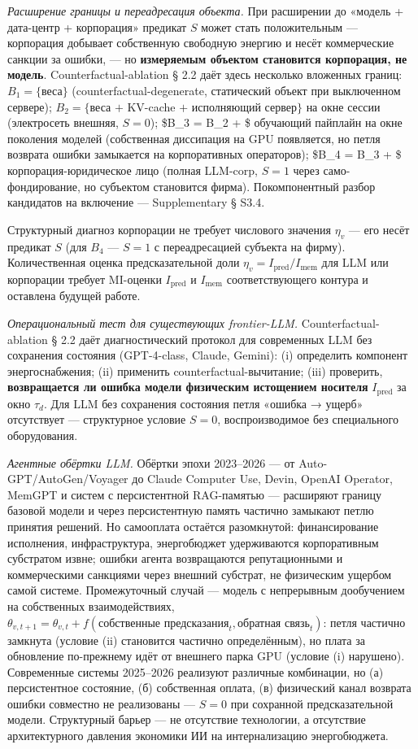 \documentclass[pdflatex,sn-mathphys-ay]{sn-jnl}
\begin{document}
\emph{Расширение границы и переадресация объекта.} При расширении до «модель + дата-центр + корпорация» предикат \(S\) может стать положительным --- корпорация добывает собственную свободную энергию и несёт коммерческие санкции за ошибки, --- но \textbf{измеряемым объектом становится корпорация, не модель}. Counterfactual-ablation § 2.2 даёт здесь несколько вложенных границ: \(B_1 = \{\)веса\(\}\) (counterfactual-degenerate, статический объект при выключенном сервере); \(B_2 = \{\)веса \(+\) KV-cache \(+\) исполняющий сервер\(\}\) на окне сессии (электросеть внешняя, \(S = 0\)); \$B\_3 = B\_2 + \$ обучающий пайплайн на окне поколения моделей (собственная диссипация на GPU появляется, но петля возврата ошибки замыкается на корпоративных операторов); \$B\_4 = B\_3 + \$ корпорация-юридическое лицо (полная LLM-corp, \(S = 1\) через само-фондирование, но субъектом становится фирма). Покомпонентный разбор кандидатов на включение --- Supplementary § S3.4.

Структурный диагноз корпорации не требует числового значения \(\eta_v\) --- его несёт предикат \(S\) (для \(B_4\) --- \(S = 1\) с переадресацией субъекта на фирму). Количественная оценка предсказательной доли \(\eta_v = I_{\text{pred}}/I_{\text{mem}}\) для LLM или корпорации требует MI-оценки \(I_{\text{pred}}\) и \(I_{\text{mem}}\) соответствующего контура и оставлена будущей работе.

\emph{Операциональный тест для существующих frontier-LLM.} Counterfactual-ablation § 2.2 даёт диагностический протокол для современных LLM без сохранения состояния (GPT-4-class, Claude, Gemini): (i) определить компонент энергоснабжения; (ii) применить counterfactual-вычитание; (iii) проверить, \textbf{возвращается ли ошибка модели физическим истощением носителя} \(I_{\text{pred}}\) за окно \(\tau_d\). Для LLM без сохранения состояния петля «ошибка → ущерб» отсутствует --- структурное условие \(S = 0\), воспроизводимое без специального оборудования.

\emph{Агентные обёртки LLM.} Обёртки эпохи 2023--2026 --- от Auto-GPT/AutoGen/Voyager до Claude Computer Use, Devin, OpenAI Operator, MemGPT и систем с персистентной RAG-памятью --- расширяют границу базовой модели и через персистентную память частично замыкают петлю принятия решений. Но самооплата остаётся разомкнутой: финансирование исполнения, инфраструктура, энергобюджет удерживаются корпоративным субстратом извне; ошибки агента возвращаются репутационными и коммерческими санкциями через внешний субстрат, не физическим ущербом самой системе. Промежуточный случай --- модель с непрерывным дообучением на собственных взаимодействиях, \(\theta_{v,t+1} = \theta_{v,t} + f(\text{собственные предсказания}_t, \text{обратная связь}_t)\): петля частично замкнута (условие (ii) становится частично определённым), но плата за обновление по-прежнему идёт от внешнего парка GPU (условие (i) нарушено). Современные системы 2025--2026 реализуют различные комбинации, но (а) персистентное состояние, (б) собственная оплата, (в) физический канал возврата ошибки совместно не реализованы --- \(S = 0\) при сохранной предсказательной модели. Структурный барьер --- не отсутствие технологии, а отсутствие архитектурного давления экономики ИИ на интернализацию энергобюджета.
\end{document}
